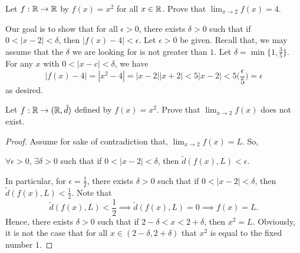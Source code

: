 \documentclass[a4paper]{article}
\begin{document}
\begin{eg}
    Let \( f: \mathbb{R} \to \mathbb{R}  \) by \( f(x) = x^{2} \) for all \( x \in \mathbb{R}  \). Prove that \( \lim_{ x \to 2 }  f(x) = 4 \). 

    Our goal is to show that for all \( \epsilon > 0  \), there exists \( \delta > 0  \) such that if \( 0 < | x - 2  | < \delta \), then \( | f(x) - 4  |  < \epsilon  \). Let \( \epsilon > 0  \) be given. Recall that, we may assume that the \( \delta  \) we are looking for is not greater than \( 1  \). Let \( \delta = \min \{ 1 , \frac{ 3 }{ 5 }  \}  \). For any \( x  \) with \( 0 < | x - c  | < \delta \), we have 
    \[  | f(x) - 4  |   = | x^{2} - 4  |  = | x - 2  |  | x + 2  | < 5 | x - 2  |  < 5 \Big( \frac{ \epsilon  }{ 5  } \Big)  = \epsilon  \]
    as desired.
\end{eg}

\begin{eg}
    Let \( f: \mathbb{R} \to (\mathbb{R}, \tilde{d}) \) defined by \( f(x) = x^{2} \). Prove that \( \lim_{ x \to 2 } f(x)  \) does not exist. 
\end{eg}
\begin{proof}
Assume for sake of contradiction that, \( \lim_{ x \to 2 }  f(x) =  L \). So, 
\begin{center}
    \( \forall \epsilon > 0  \), \( \exists \delta > 0  \) such that if \(  0 < |  x - 2  |  < \delta  \), then \( \tilde{d}(f(x), L) < \epsilon \).
\end{center}
In particular, for \( \epsilon = \frac{ 1 }{ 2 }  \), there exists \( \delta > 0  \) such that if \( 0 < | x - 2  |  < \delta  \), then \( \tilde{d}(f(x), L) < \frac{ 1 }{ 2 }  \). Note that 
\[  \tilde{d}(f(x), L) < \frac{ 1 }{ 2 } \implies \tilde{d}(f(x), L) = 0 \implies f(x) = L.  \]
Hence, there exists \( \delta > 0  \) such that if \( 2 - \delta < x < 2 + \delta  \), then \( x^{2} = L  \). Obviously, it is not the case that for all \( x \in (2-  \delta, 2 + \delta) \) that \( x^{2}  \) is equal to the fixed number \( 1  \). 
\end{proof}
\end{document}
